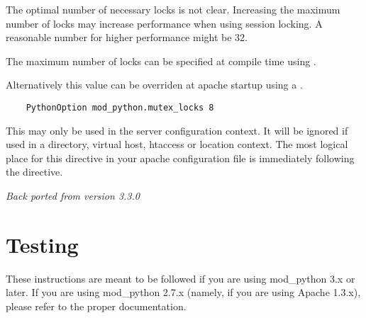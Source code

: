 \begin{description}
  The optimal number of necessary locks is not clear. 
  Increasing the maximum number of locks may increase performance
  when using session locking.  A reasonable number for 
  higher performance might be 32.

  The maximum number of locks can be specified at compile time
  using .

  Alternatively this value can be overriden at apache startup using 
  a .

  \begin{verbatim}
    PythonOption mod_python.mutex_locks 8 
  \end{verbatim}

  This may only be used in the server configuration context.
  It will be ignored if used in a directory, virtual host,
  htaccess or location context. The most logical place for this 
  directive in your apache configuration file is immediately
  following the  directive.

  \emph{Back ported from version 3.3.0}

\end{description}

\section{Testing\label{inst-testing}}

 These instructions are meant to be followed if you are
using mod_python 3.x or later. If you are using mod_python 2.7.x (namely,
if you are using Apache 1.3.x), please refer to the proper documentation.

